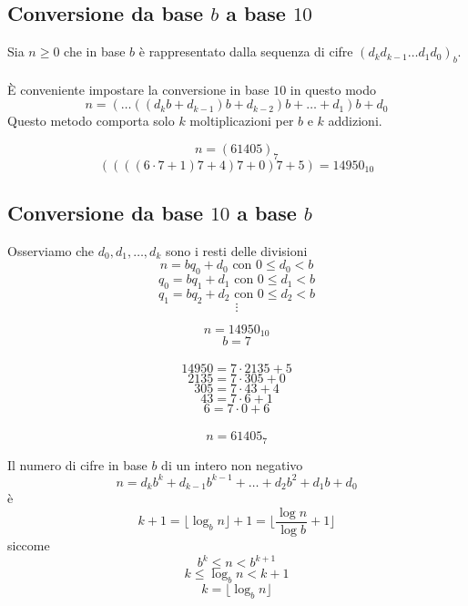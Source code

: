 \documentclass[a4paper,12pt, oneside]{book}
\begin{document}
	\subsection{Conversione da base \textbf{$b$} a base \textbf{$10$}}
	\begin{teorema}
		Sia $n \geq 0$ che in base $b$ è rappresentato dalla sequenza di cifre $(d_k d_{k-1} \dots d_1 d_0)_b$.\\\\
		È conveniente impostare la conversione in base $10$ in questo modo
		$$n = ( \dots ((d_kb+d_{k-1})b+d_{k-2})b+ \dots +d_1)b+d_0$$
		Questo metodo comporta solo $k$ moltiplicazioni per $b$ e $k$ addizioni.
	\end{teorema}
	\begin{shaded}
		\begin{esempio}
			$$n = (61405)_7$$ $$((((6 \cdot 7 + 1)7 + 4)7+0)7+5) = 14950_{10}$$
		\end{esempio}
	\end{shaded}
	
	\subsection{Conversione da base \textbf{$10$} a base \textbf{$b$}}
	\begin{teorema}
		Osserviamo che $d_0, d_1, \dots, d_k$ sono i resti delle divisioni
		$$n = bq_0 +d_0 \mbox{ con } 0 \leq d_0 < b$$
		$$q_0 = bq_1 +d_1 \mbox{ con } 0 \leq d_1 < b$$
		$$q_1 = bq_2 +d_2 \mbox{ con } 0 \leq d_2< b$$
		$$ \vdots $$
	\end{teorema}
	\begin{shaded}
		\begin{esempio}
			$$n = 14950_{10}$$
			$$b=7$$\\
			$$14950 = 7 \cdot 2135 + 5$$
			$$2135 = 7 \cdot 305 + 0$$
			$$305 = 7 \cdot 43 + 4$$
			$$43 = 7 \cdot 6 + 1$$
			$$6 = 7 \cdot 0 + 6$$\\
			$$n = 61405_{7}$$
		\end{esempio}
	\end{shaded}
	\begin{osservazione}
		Il numero di cifre in base $b$ di un intero non negativo
		$$n = d_{k}b^{k} + d_{k-1}b^{k-1} + \dots + d_{2}b^{2} + d_{1}b + d_0$$ è
		$$k+1 = \lfloor \log_bn \rfloor+1 = \lfloor \frac{\log n}{\log b}+1 \rfloor$$
		siccome
		$$b^k \leq n < b^{k+1}$$
		$$k \leq \log_bn < k+1$$
		$$k=\lfloor \log_bn \rfloor$$
	\end{osservazione}
\end{document}
